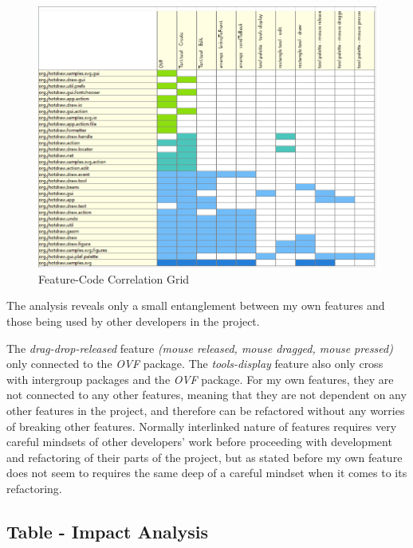\begin{figure}[H]
    \centering
    \includegraphics[width=\linewidth]{pic/Feature-Code Correlation Grid new.png}
    \caption{Feature-Code Correlation Grid}
    \label{fig:Feature-Code Correlation Grid}
\end{figure}

The analysis reveals only a small entanglement between my own features and those being used by other developers in the project.



The \textit{drag-drop-released} feature \textit{(mouse released, mouse dragged, mouse pressed)} only connected to the \textit{OVF} package.
The \textit{tools-display} feature also only cross with intergroup packages and the \textit{OVF} package.
For my own features, they are not connected to any other features, meaning that they are not dependent on any other features in the project,
and therefore can be refactored without any worries of breaking other features.
Normally interlinked nature of features requires very careful mindsets of other developers' work before proceeding with development and refactoring of
their parts of the project, but as stated before my own feature does not seem to requires the same deep of a careful mindset when it comes to its refactoring.

\subsection{Table - Impact Analysis}

